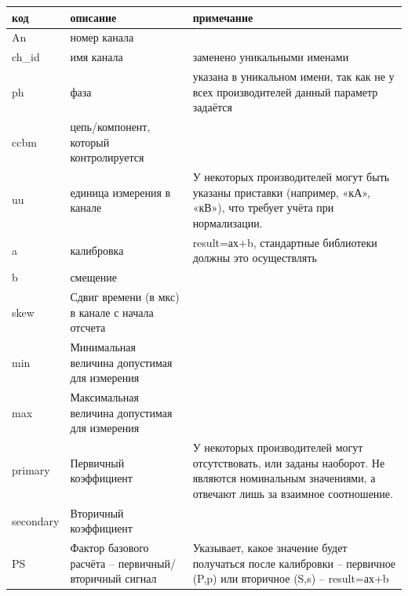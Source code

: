 
\mbox{}\par\vspace{0.2cm}
{\small
\noindent
\begin{tabularx}{\textwidth}{|>{\centering\arraybackslash}p{2.0cm}|>{\raggedright\arraybackslash}p{5.6cm}|>{\raggedright\arraybackslash}X|}
\hline
\textbf{код} &
\textbf{описание} &
\textbf{примечание} \\
\hline
An &
номер канала &
\\
\hline
ch\_id &
имя канала &
заменено уникальными именами \\
\hline
ph &
фаза &
указана в уникальном имени, так как не у всех производителей данный параметр задаётся \\
\hline
ccbm &
цепь/компонент, который контролируется &
\\
\hline
uu &
единица измерения в канале &
У некоторых производителей могут быть указаны приставки (например, «кА», «кВ»), что требует учёта при нормализации. \\
\hline
a &
калибровка &
result=ах+b, стандартные библиотеки должны это осуществлять \\
\cline{1-2}
b &
смещение &
\\
\hline
skew &
Сдвиг времени (в мкс) в канале с начала отсчета &
\\
\hline
min &
Минимальная величина допустимая для измерения &
\\
\hline
max &
Максимальная величина допустимая для измерения &
\\
\hline
primary &
Первичный коэффициент &
У некоторых производителей могут отсутствовать, или заданы наоборот. Не являются номинальным значениями, а отвечают лишь за взаимное соотношение. \\
\cline{1-2}
secondary &
Вторичный коэффициент &
\\
\hline
PS &
Фактор базового расчёта -- первичный/вторичный сигнал &
Указывает, какое значение будет получаться после калибровки -- первичное (P,p) или вторичное (S,s) -- result=ах+b \\
\hline
\end{tabularx}
}
